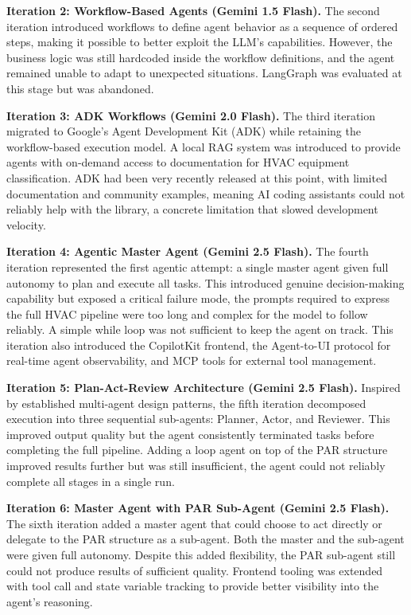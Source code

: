 \textbf{Iteration 2: Workflow-Based Agents (Gemini 1.5 Flash).}
The second iteration introduced workflows to define agent behavior as a sequence of
ordered steps, making it possible to better exploit the LLM's capabilities. However,
the business logic was still hardcoded inside the workflow definitions, and the agent
remained unable to adapt to unexpected situations. LangGraph was evaluated at this stage
but was abandoned. 

\textbf{Iteration 3: ADK Workflows (Gemini 2.0 Flash).}
The third iteration migrated to Google's Agent Development Kit (ADK) while retaining
the workflow-based execution model. A local RAG system was introduced to provide agents
with on-demand access to documentation for HVAC equipment classification. ADK had been
very recently released at this point, with limited documentation and community examples,
meaning AI coding assistants could not reliably help with the library, a concrete
limitation that slowed development velocity.

\textbf{Iteration 4: Agentic Master Agent (Gemini 2.5 Flash).}
The fourth iteration represented the first agentic attempt: a single master agent
given full autonomy to plan and execute all tasks. This introduced genuine decision-making
capability but exposed a critical failure mode, the prompts required to express the
full HVAC pipeline were too long and complex for the model to follow reliably. A simple
while loop was not sufficient to keep the agent on track. This iteration also introduced
the CopilotKit frontend, the Agent-to-UI protocol for real-time agent observability, and
MCP tools for external tool management.

\textbf{Iteration 5: Plan-Act-Review Architecture (Gemini 2.5 Flash).}
Inspired by established multi-agent design patterns, the fifth iteration decomposed
execution into three sequential sub-agents: Planner, Actor, and Reviewer. This improved
output quality but the agent consistently terminated tasks before completing the full
pipeline. Adding a loop agent on top of the PAR structure improved results further but
was still insufficient, the agent could not reliably complete all stages in a single
run.

\textbf{Iteration 6: Master Agent with PAR Sub-Agent (Gemini 2.5 Flash).}
The sixth iteration added a master agent that could choose to act directly or delegate to
the PAR structure as a sub-agent. Both the master and the sub-agent were given full
autonomy. Despite this added flexibility, the PAR sub-agent still could not produce
results of sufficient quality. Frontend tooling was extended with tool call and state
variable tracking to provide better visibility into the agent's reasoning.

